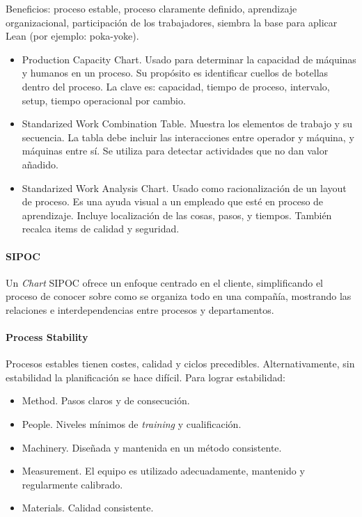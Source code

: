 \documentclass[]{article}
\begin{document}
Beneficios: proceso estable, proceso claramente definido, aprendizaje organizacional, participación de los trabajadores, siembra la base para aplicar Lean (por ejemplo: poka-yoke).

\begin{itemize}
	\item Production Capacity Chart. Usado para determinar la capacidad de máquinas y humanos en un proceso. Su propósito es identificar cuellos de botellas dentro del proceso. La clave es: capacidad, tiempo de proceso, intervalo, setup, tiempo operacional por cambio.
	\item Standarized Work Combination Table. Muestra los elementos de trabajo y su secuencia. La tabla debe incluir las interacciones entre operador y máquina, y máquinas entre sí. Se utiliza para detectar actividades que no dan valor añadido.
	\item Standarized Work Analysis Chart. Usado como racionalización de un layout de proceso. Es una ayuda visual a un empleado que esté en proceso de aprendizaje. Incluye localización de las cosas, pasos, y tiempos. También recalca items de calidad y seguridad.
\end{itemize}

\paragraph{SIPOC}

Un \textit{Chart} SIPOC ofrece un enfoque centrado en el cliente, simplificando el proceso de conocer sobre como se organiza todo en una compañía, mostrando las relaciones e interdependencias entre procesos y departamentos.

\paragraph{Process Stability}
Procesos estables tienen costes, calidad y ciclos precedibles. Alternativamente, sin estabilidad la planificación se hace difícil. Para lograr estabilidad:
\begin{itemize}
	\item Method. Pasos claros y de consecución.
	\item People. Niveles mínimos de \textit{training} y cualificación.
	\item Machinery. Diseñada y mantenida en un método consistente.
	\item Measurement. El equipo es utilizado adecuadamente, mantenido y regularmente calibrado.
	\item Materials. Calidad consistente.
\end{itemize}
\end{document}
